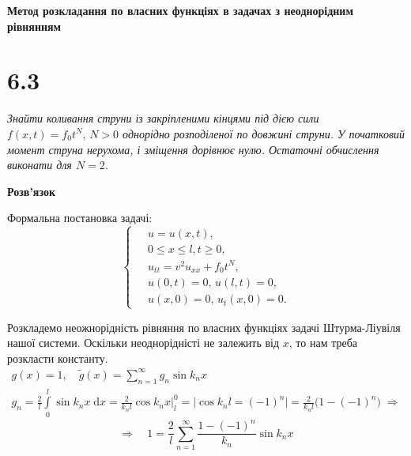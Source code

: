 

%


\textbf{\large Метод розкладання по власних функціях в задачах з неоднорідним рівнянням}

\section[Задача №6.3]{6.3}

\textit{Знайти коливання струни із закріпленими кінцями під дією сили $f(x,t) = f_0 t^N, \, N > 0$ однорідно розподіленої по довжині струни. У початковий момент струна нерухома, і зміщення дорівнює нулю. Остаточні обчислення виконати
для $N=2$.}

\begin{center}
    \large{\textbf{Розв'язок}}
\end{center}

\noindent Формальна постановка задачі:
\begin{equation} \label{cond6,3}
    \left\{ \begin{aligned} %
            \;&u = u(x,t), \\
            &0 \leq x \leq l, t \geq 0, \\
            &u_{tt} = v^2u_{xx} + f_0 t^N, \\
            &u(0,t) = 0,\, u(l,t) = 0,\\
            &u(x,0) = 0,\, u_t(x,0) = 0.
    \end{aligned} \right.
\end{equation}

Розкладемо неожнорідність рівняння по власних функціях задачі Штурма-Ліувіля нашої системи. Оскільки неоднорідністі не залежить від $x$, то нам треба розкласти константу.
\begin{equation*} 
    \begin{gathered}
        g(x) = 1, \quad \tilde{g}(x) = \sum_{n=1}^\infty g_n \sin k_nx\\
        g_n = \frac{2}{l} \int\limits_0^l \sin k_nx \;\mathrm{d}x = \frac{2}{k_nl} \cos k_nx \bigg|_l^0 = \big| \cos k_nl = (-1)^n \big| = \frac{2}{k_nl}\big(1 - (-1)^n\big)
        \;\Rightarrow
    \end{gathered}
\end{equation*}
\begin{equation} \label{Fourier-exp6,3}
    \Rightarrow\quad
    1 = \frac{2}{l} \sum_{n=1}^\infty \frac{1 - (-1)^n}{k_n} \sin k_nx    
\end{equation}

